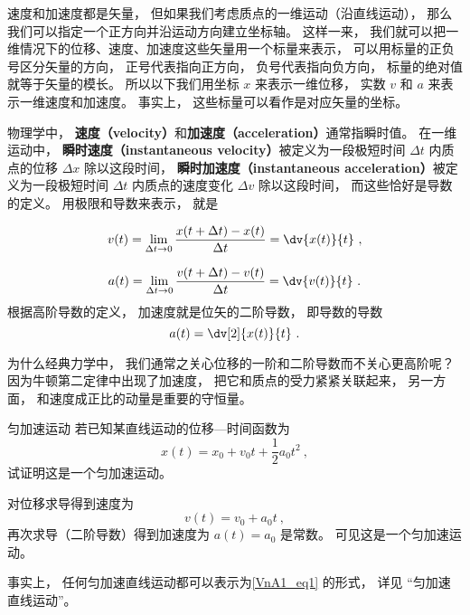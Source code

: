 

速度和加速度都是矢量， 但如果我们考虑质点的一维运动（沿直线运动）， 那么我们可以指定一个正方向并沿运动方向建立坐标轴。 这样一来， 我们就可以把一维情况下的位移、速度、加速度这些矢量用一个标量来表示， 可以用标量的正负号区分矢量的方向， 正号代表指向正方向， 负号代表指向负方向， 标量的绝对值就等于矢量的模长。 所以以下我们用坐标 $x$ 来表示一维位移， 实数 $v$ 和 $a$ 来表示一维速度和加速度。 事实上， 这些标量可以看作是对应矢量的坐标。

物理学中， \textbf{速度（velocity）}和\textbf{加速度（acceleration）}通常指瞬时值。 在一维运动中， \textbf{瞬时速度（instantaneous velocity）}被定义为一段极短时间 $\Delta t$ 内质点的位移 $\Delta x$ 除以这段时间， \textbf{瞬时加速度（instantaneous acceleration）}被定义为一段极短时间 $\Delta t$ 内质点的速度变化 $\Delta v$ 除以这段时间， 而这些恰好是导数的定义。 用极限和导数来表示， 就是

\begin{equation}
v(t) = \lim_{\Delta t\to 0} \frac{x(t+\Delta t) - x(t)}{\Delta t} = \dv{x(t)}{t}~,
\end{equation}

\begin{equation}
a(t) = \lim_{\Delta t\to 0} \frac{v(t+\Delta t) - v(t)}{\Delta t} = \dv{v(t)}{t}~.
\end{equation}
根据高阶导数的定义， 加速度就是位矢的二阶导数， 即导数的导数
\begin{equation}
a(t) = \dv[2]{x(t)}{t}~.
\end{equation}

为什么经典力学中， 我们通常之关心位移的一阶和二阶导数而不关心更高阶呢？ 因为牛顿第二定律中出现了加速度， 把它和质点的受力紧紧关联起来， 另一方面， 和速度成正比的动量是重要的守恒量。

\begin{example}{匀加速运动}\label{VnA1_ex1}
若已知某直线运动的位移—时间函数为
\begin{equation}\label{VnA1_eq1}
x(t) = x_0 + v_0 t + \frac{1}{2} a_0 t^2~,
\end{equation}
试证明这是一个匀加速运动。

对位移求导得到速度为
\begin{equation}
v(t) = v_0 + a_0 t~,
\end{equation}
再次求导（二阶导数）得到加速度为 $a(t) = a_0$ 是常数。 可见这是一个匀加速运动。
\end{example}
事实上， 任何匀加速直线运动都可以表示为\autoref{VnA1_eq1} 的形式， 详见 “匀加速直线运动”。

